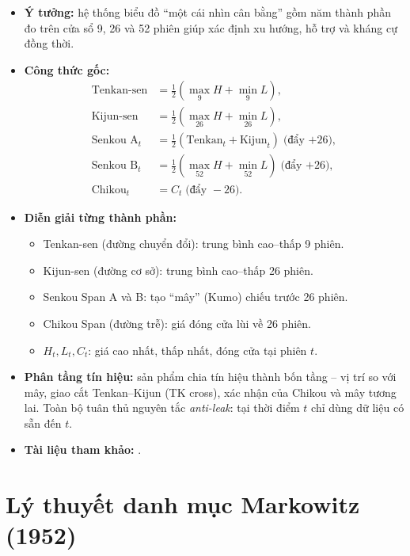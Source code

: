 \documentclass[12pt,a4paper,openany,oneside]{report}
\numberwithin{equation}{chapter}
\begin{document}
\begin{itemize}[leftmargin=18pt,topsep=2pt,itemsep=4pt]
  \item \textbf{Ý tưởng:} hệ thống biểu đồ ``một cái nhìn cân bằng''
        gồm năm thành phần đo trên cửa sổ 9, 26 và 52 phiên giúp xác
        định xu hướng, hỗ trợ và kháng cự đồng thời.
  \item \textbf{Công thức gốc:}
        \begin{align}
          \text{Tenkan-sen} &= \tfrac{1}{2}\!\left(\max_{9}H + \min_{9}L\right),\\
          \text{Kijun-sen}  &= \tfrac{1}{2}\!\left(\max_{26}H + \min_{26}L\right),
                              \label{eq:ichimoku}\\
          \text{Senkou A}_t &= \tfrac{1}{2}\!\left(\text{Tenkan}_t + \text{Kijun}_t\right) \;\text{(đẩy +26)},\\
          \text{Senkou B}_t &= \tfrac{1}{2}\!\left(\max_{52}H + \min_{52}L\right) \;\text{(đẩy +26)},\\
          \text{Chikou}_t   &= C_t \;\text{(đẩy }-26).
        \end{align}
  \item \textbf{Diễn giải từng thành phần:}
        \begin{itemize}[leftmargin=14pt,topsep=2pt,itemsep=1pt]
          \item Tenkan-sen (đường chuyển đổi): trung bình cao--thấp 9 phiên.
          \item Kijun-sen (đường cơ sở): trung bình cao--thấp 26 phiên.
          \item Senkou Span A và B: tạo ``mây'' (Kumo) chiếu trước 26 phiên.
          \item Chikou Span (đường trễ): giá đóng cửa lùi về 26 phiên.
          \item $H_t, L_t, C_t$: giá cao nhất, thấp nhất, đóng cửa tại phiên $t$.
        \end{itemize}
  \item \textbf{Phân tầng tín hiệu:} sản phẩm chia tín hiệu thành bốn
        tầng -- vị trí so với mây, giao cắt Tenkan--Kijun (TK cross),
        xác nhận của Chikou và mây tương lai. Toàn bộ tuân thủ nguyên
        tắc \emph{anti-leak}: tại thời điểm $t$ chỉ dùng dữ liệu có sẵn
        đến $t$.
  \item \textbf{Tài liệu tham khảo:} \citet{Hosoda1969}.
\end{itemize}

\section{Lý thuyết danh mục Markowitz (1952)}
\end{document}
